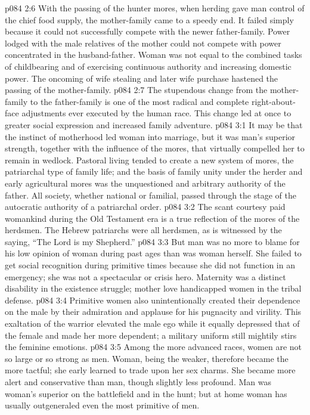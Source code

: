 \vs p084 2:6 With the passing of the hunter mores, when herding gave man control of the chief food supply, the mother\hyp{}family came to a speedy end. It failed simply because it could not successfully compete with the newer father\hyp{}family. Power lodged with the male relatives of the mother could not compete with power concentrated in the husband\hyp{}father. Woman was not equal to the combined tasks of childbearing and of exercising continuous authority and increasing domestic power. The oncoming of wife stealing and later wife purchase hastened the passing of the mother\hyp{}family.
\vs p084 2:7 The stupendous change from the mother\hyp{}family to the father\hyp{}family is one of the most radical and complete right\hyp{}about\hyp{}face adjustments ever executed by the human race. This change led at once to greater social expression and increased family adventure.
\vs p084 3:1 It may be that the instinct of motherhood led woman into marriage, but it was man’s superior strength, together with the influence of the mores, that virtually compelled her to remain in wedlock. Pastoral living tended to create a new system of mores, the patriarchal type of family life; and the basis of family unity under the herder and early agricultural mores was the unquestioned and arbitrary authority of the father. All society, whether national or familial, passed through the stage of the autocratic authority of a patriarchal order.
\vs p084 3:2 The scant courtesy paid womankind during the Old Testament era is a true reflection of the mores of the herdsmen. The Hebrew patriarchs were all herdsmen, as is witnessed by the saying, “The Lord is my Shepherd.”
\vs p084 3:3 But man was no more to blame for his low opinion of woman during past ages than was woman herself. She failed to get social recognition during primitive times because she did not function in an emergency; she was not a spectacular or crisis hero. Maternity was a distinct disability in the existence struggle; mother love handicapped women in the tribal defense.
\vs p084 3:4 Primitive women also unintentionally created their dependence on the male by their admiration and applause for his pugnacity and virility. This exaltation of the warrior elevated the male ego while it equally depressed that of the female and made her more dependent; a military uniform still mightily stirs the feminine emotions.
\vs p084 3:5 Among the more advanced races, women are not so large or so strong as men. Woman, being the weaker, therefore became the more tactful; she early learned to trade upon her sex charms. She became more alert and conservative than man, though slightly less profound. Man was woman’s superior on the battlefield and in the hunt; but at home woman has usually outgeneraled even the most primitive of men.
